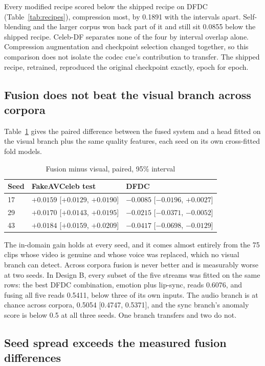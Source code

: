 \documentclass[conference]{IEEEtran}
\begin{document}
Every modified recipe scored below the shipped recipe on DFDC
(Table~\ref{tab:recipes}), compression most, by
0.1891 with the intervals apart. Self-blending and the larger corpus won back
part of it and still sit 0.0855 below the shipped recipe. Celeb-DF separates
none of the four by interval overlap alone. Compression augmentation and
checkpoint selection changed together, so this comparison does not isolate
the codec cue's contribution to transfer. The shipped recipe, retrained,
reproduced the original checkpoint exactly, epoch for epoch.

\subsection{Fusion does not beat the visual branch across corpora}

Table~\ref{tab:fusion} gives the paired difference between the fused system and
a head fitted on the visual branch plus the same quality features, each seed on
its own cross-fitted fold models.

\begin{table}[htbp]
\caption{Fusion minus visual, paired, 95\% interval}
\label{tab:fusion}
\centering
\begin{tabular}{lll}
\toprule
Seed & FakeAVCeleb test & DFDC \\
\midrule
17 & $+0.0159$ [$+0.0129$, $+0.0190$] & $-0.0085$ [$-0.0196$, $+0.0027$] \\
29 & $+0.0170$ [$+0.0143$, $+0.0195$] & $-0.0215$ [$-0.0371$, $-0.0052$] \\
43 & $+0.0184$ [$+0.0159$, $+0.0209$] & $-0.0417$ [$-0.0698$, $-0.0129$] \\
\bottomrule
\end{tabular}
\end{table}

The in-domain gain holds at every seed, and it comes almost entirely from the
75 clips whose video is genuine and whose voice was replaced, which no visual
branch can detect. Across corpora fusion is never better and is measurably
worse at two seeds. In Design B, every subset of the five streams was fitted
on the same rows: the best DFDC combination, emotion plus lip-sync, reads
0.6076, and fusing all five reads 0.5411, below three of its own inputs. The
audio branch is at chance across corpora, 0.5054 [0.4747, 0.5371], and the
sync branch's anomaly score is below 0.5 at all three seeds. One branch
transfers and two do not.

\subsection{Seed spread exceeds the measured fusion differences}
\end{document}
